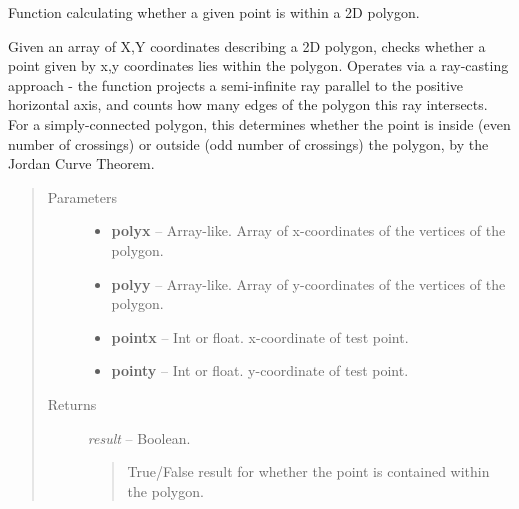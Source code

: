 \documentclass[letterpaper,10pt,english]{sphinxmanual}
\begin{document}
\begin{fulllineitems}
\label{eqtools:eqtools.core.inPolygon}
Function calculating whether a given point is within a 2D polygon.

Given an array of X,Y coordinates describing a 2D polygon, checks whether
a point given by x,y coordinates lies within the polygon.  Operates via a
ray-casting approach - the function projects a semi-infinite ray parallel to the
positive horizontal axis, and counts how many edges of the polygon this ray intersects.
For a simply-connected polygon, this determines whether the point is inside (even number
of crossings) or outside (odd number of crossings) the polygon, by the Jordan Curve Theorem.
\begin{quote}\begin{description}
\item[{Parameters }] \leavevmode\begin{itemize}
\item {} 
\textbf{polyx} --
Array-like.
Array of x-coordinates of the vertices of the polygon.

\item {} 
\textbf{polyy} --
Array-like.
Array of y-coordinates of the vertices of the polygon.

\item {} 
\textbf{pointx} --
Int or float.
x-coordinate of test point.

\item {} 
\textbf{pointy} --
Int or float.
y-coordinate of test point.

\end{itemize}

\item[{Returns}] \leavevmode

\emph{result} --
Boolean.
\begin{quote}

True/False result for whether the point is contained within the polygon.
\end{quote}


\end{description}\end{quote}

\end{fulllineitems}

\end{document}

